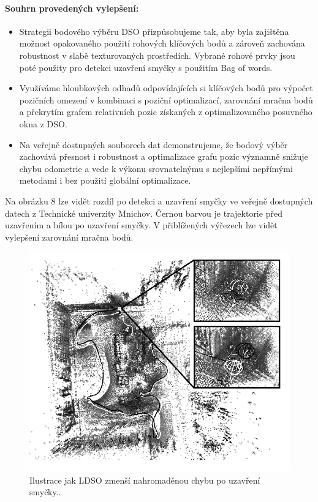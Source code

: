 \documentclass[12pt,a4paper]{article}
\begin{document}
\paragraph*{Souhrn provedených vylepšení:}
\begin{itemize}
\item Strategii bodového výběru DSO přizpůsobujeme tak, aby byla zajištěna možnost opakovaného použití rohových klíčových bodů a zároveň zachována robustnost v slabě texturovaných prostředích. Vybrané rohové prvky jsou poté použity pro detekci uzavření smyčky s použitím Bag of words.
\item Využíváme hloubkových odhadů odpovídajících si klíčových bodů pro výpočet \newline pozičních omezení v kombinaci s poziční optimalizací, zarovnání mračna bodů a překrytím grafem relativních pozic získaných z optimalizovaného posuvného okna z DSO.
\item Na veřejně dostupných souborech dat demonstrujeme, že bodový výběr zachovává přesnost i robustnost a optimalizace grafu pozic významně snižuje chybu odometrie a vede k výkonu srovnatelnýmu s nejlepšími nepřímými metodami i bez použití globální optimalizace.
\end{itemize}

Na obrázku 8 lze vidět rozdíl po detekci a uzavření smyčky ve veřejně dostupných datech z Technické univerzity Mnichov. Černou barvou je trajektorie před uzavřením a bílou po uzavření smyčky. V přiblížených výřezech lze vidět vylepšení zarovnání mračna bodů.

\begin{figure}[H]
\centering
\includegraphics[scale=0.75]{img/Obr6_b.png}
\caption{Ilustrace jak LDSO zmenší nahromaděnou chybu po uzavření smyčky.\cite{LDSO}.}
\end{figure}
\end{document}

